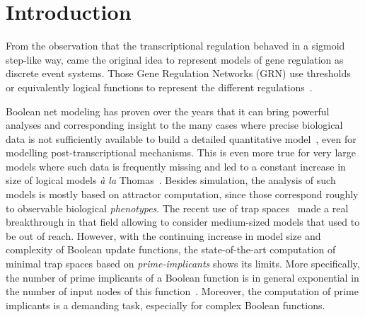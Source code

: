 \documentclass[preprint,12pt]{elsarticle}
\begin{document}
\linenumbers%

\section{Introduction}

From the observation that the transcriptional regulation behaved in a sigmoid step-like way, came the original idea to represent models of gene regulation as discrete event systems.
Those Gene Regulation Networks (GRN) use thresholds or equivalently logical functions to represent the different regulations~\cite{glass1973logical,thomas1973boolean,thomas1990biological,thomas1991regulatory}.

Boolean net modeling has proven over the years that it can bring powerful analyses and corresponding insight to the many cases where precise biological data is not sufficiently available to build a detailed quantitative model~\cite{wang2012boolean}, even for modelling post-transcriptional mechanisms.
This is even more true for very large models where such data is frequently missing and led to a constant increase in size of logical models \emph{à la} Thomas~\cite{aghamiri2020automated}.
Besides simulation, the analysis of such models is mostly based on attractor computation, since those correspond roughly to observable biological \emph{phenotypes}.
The recent use of trap spaces~\cite{klarner2015computing} made a real breakthrough in that field allowing to consider medium-sized models that used to be out of reach.
However, with the continuing increase in model size and complexity of Boolean update functions, the state-of-the-art computation of minimal trap spaces based on \emph{prime-implicants} shows its limits.
More specifically, the number of prime implicants of a Boolean function is in general exponential in the number of input nodes of this function~\cite{klarner2015computing}.
Moreover, the computation of prime implicants is a demanding task, especially for complex Boolean functions.
\end{document}
